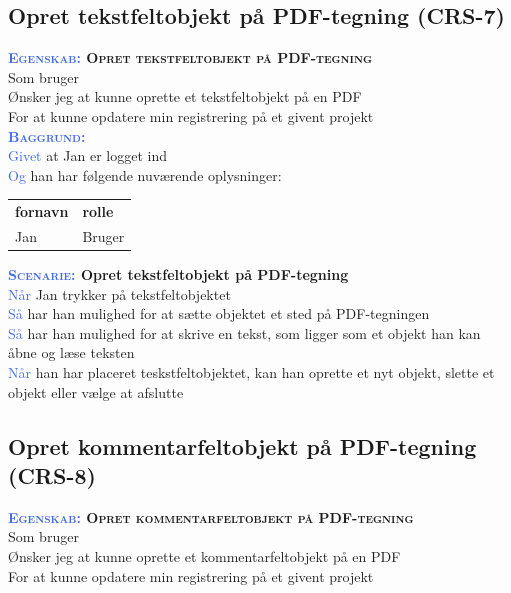\subsection{Opret tekstfeltobjekt på PDF-tegning (CRS-7)} \label{sec:USOpretTekstfelt}
\textbf{\textsc{\textcolor{RoyalBlue}{Egenskab:} Opret tekstfeltobjekt på PDF-tegning}}\\
Som bruger\\
Ønsker jeg at kunne oprette et tekstfeltobjekt på en PDF\\
For at kunne opdatere min registrering på et givent projekt \\

\textsc{\textcolor{RoyalBlue}{\textbf{Baggrund:}}}\\
\textcolor{RoyalBlue}{Givet} at Jan er logget ind\\
\textcolor{RoyalBlue}{Og} han har følgende nuværende oplysninger:\\
\begin{tabular}{| l | l |}
	\textbf{fornavn} & \textbf{rolle} \\
	Jan & Bruger\\
\end{tabular}

\textbf{\textsc{\textcolor{RoyalBlue}{Scenarie:}} Opret tekstfeltobjekt på PDF-tegning}\\
\textcolor{RoyalBlue}{Når} Jan trykker på tekstfeltobjektet\\
\textcolor{RoyalBlue}{Så}  har han mulighed for at sætte objektet et sted på PDF-tegningen\\
\textcolor{RoyalBlue}{Så}  har han mulighed for at skrive en tekst, som ligger som et objekt han kan åbne og læse teksten\\
\textcolor{RoyalBlue}{Når} han har placeret teskstfeltobjektet, kan han oprette et nyt objekt, slette et objekt eller vælge at afslutte \\

\subsection{Opret kommentarfeltobjekt på PDF-tegning (CRS-8)} \label{sec:USOpretKommentarfelt}
\textbf{\textsc{\textcolor{RoyalBlue}{Egenskab:} Opret kommentarfeltobjekt på PDF-tegning}}\\
Som bruger\\
Ønsker jeg at kunne oprette et kommentarfeltobjekt på en PDF\\
For at kunne opdatere min registrering på et givent projekt \\


